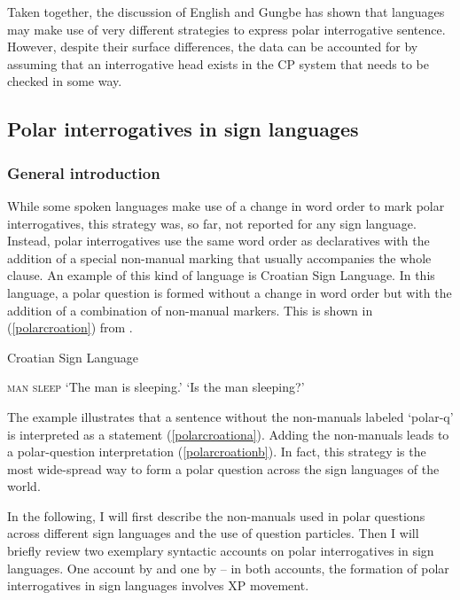 Taken together, the discussion of English and Gungbe has shown that languages may make use of very different strategies to express polar interrogative sentence. However, despite their surface differences, the data can be accounted for by assuming that an interrogative head exists in the CP system that needs to be checked in some way.

\subsection{Polar interrogatives in sign languages}\label{polarintsign}



\subsubsection{General introduction}
While some spoken languages make use of a change in word order to mark polar interrogatives, this strategy was, so far, not reported for any sign language. Instead, polar interrogatives use the same word order as declaratives with the addition of a special non-manual marking that usually accompanies the whole clause. An example of this kind of language is Croatian Sign Language. In this language, a polar question is formed without a change in word order but with the addition of a combination of non-manual markers. This is shown in (\ref{polarcroation}) from \citet[157]{sarac2006interrogative}.

\begin{exe}
\ex Croatian Sign Language\label{polarcroation}\begin{xlist}
\ex \textsc{man sleep}
\glt `The man is sleeping.' \label{polarcroationa} 
\ex {}
\glt `Is the man sleeping?' \label{polarcroationb} 
\end{xlist}
\end{exe}


\noindent The example illustrates that a sentence without the non-manuals labeled `polar-q' is interpreted as a statement (\ref{polarcroationa}). Adding the non-manuals leads to a polar-question interpretation (\ref{polarcroationb}). In fact, this strategy is the most wide-spread way to form a polar question across the sign languages of the world.

In the following, I will first describe the non-manuals used in polar questions across different sign languages and the use of question particles. Then I will briefly review two exemplary syntactic accounts on polar interrogatives in sign languages. One account by \citet{sarac2006interrogative} and one by \citet{aboh2010sa} -- in both accounts, the formation of polar interrogatives in sign languages involves XP movement.

